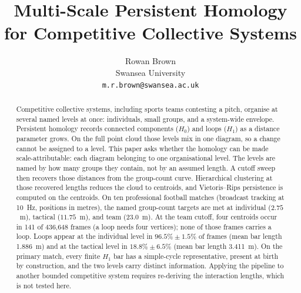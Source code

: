\documentclass{article}
\title{Multi-Scale Persistent Homology for Competitive Collective Systems}
\author{
 Rowan Brown \\
  Swansea University \\
  \texttt{m.r.brown@swansea.ac.uk}
}
\theoremstyle{plain}
\begin{document}
\maketitle

\begin{abstract}
Competitive collective systems, including sports teams contesting a
pitch, organise at several named levels at once: individuals, small
groups, and a system-wide envelope. Persistent homology records
connected components ($H_0$) and loops ($H_1$) as a distance parameter
grows. On the full point cloud those levels mix in one diagram, so a
change cannot be assigned to a level. This paper asks whether the
homology can be made scale-attributable: each diagram belonging to one
organisational level.
The levels are named by how many groups they contain, not by an assumed
length. A cutoff sweep then recovers those distances from the
group-count curve. Hierarchical clustering at those recovered lengths
reduces the cloud to centroids, and Vietoris--Rips persistence is
computed on the centroids.
On ten professional football matches (broadcast tracking at 10~Hz,
positions in metres), the named group-count targets are met at
individual ($2.75$~m), tactical ($11.75$~m), and team ($23.0$~m).
At the team cutoff, four centroids occur in 141 of 436{,}648 frames
(a loop needs four vertices); none of those frames carries a loop. Loops appear at the individual level in
$96.5\%\pm 1.5\%$ of frames (mean bar length 1.886~m) and at the
tactical level in $18.8\%\pm 6.5\%$ (mean bar length 3.411~m). On the
primary match, every finite $H_1$ bar has a simple-cycle
representative, present at birth by construction, and the two levels
carry distinct information.
Applying the pipeline to another bounded competitive system requires
re-deriving the interaction lengths, which is not tested here.
\end{abstract}










\FloatBarrier


\end{document}
